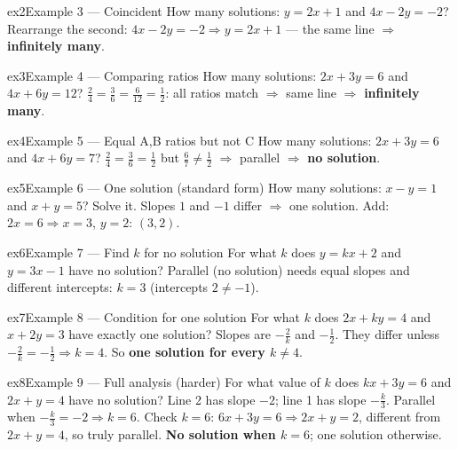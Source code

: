 \documentclass[11pt]{article}
\begin{document}
\begin{example}{ex2}{Example 3 --- Coincident}
How many solutions: $y=2x+1$ and $4x-2y=-2$?
\soln Rearrange the second: $4x-2y=-2\Rightarrow y=2x+1$ --- the same line $\Rightarrow$ \textbf{infinitely many}.
\end{example}

\begin{example}{ex3}{Example 4 --- Comparing ratios}
How many solutions: $2x+3y=6$ and $4x+6y=12$?
\soln $\tfrac{2}{4}=\tfrac{3}{6}=\tfrac{6}{12}=\tfrac12$: all ratios match $\Rightarrow$ same line $\Rightarrow$ \textbf{infinitely many}.
\end{example}

\begin{example}{ex4}{Example 5 --- Equal A,B ratios but not C}
How many solutions: $2x+3y=6$ and $4x+6y=7$?
\soln $\tfrac{2}{4}=\tfrac{3}{6}=\tfrac12$ but $\tfrac{6}{7}\neq\tfrac12$ $\Rightarrow$ parallel $\Rightarrow$ \textbf{no solution}.
\end{example}

\begin{example}{ex5}{Example 6 --- One solution (standard form)}
How many solutions: $x-y=1$ and $x+y=5$? Solve it.
\soln Slopes $1$ and $-1$ differ $\Rightarrow$ one solution. Add: $2x=6\Rightarrow x=3$, $y=2$: $(3,2)$.
\end{example}

\begin{example}{ex6}{Example 7 --- Find $k$ for no solution}
For what $k$ does $y=kx+2$ and $y=3x-1$ have no solution?
\soln Parallel (no solution) needs equal slopes and different intercepts: $k=3$ (intercepts $2\neq-1$).
\end{example}

\begin{example}{ex7}{Example 8 --- Condition for one solution}
For what $k$ does $2x+ky=4$ and $x+2y=3$ have exactly one solution?
\soln Slopes are $-\tfrac{2}{k}$ and $-\tfrac12$. They differ unless $-\tfrac{2}{k}=-\tfrac12\Rightarrow k=4$. So \textbf{one solution for every $k\neq4$}.
\end{example}

\begin{example}{ex8}{Example 9 --- Full analysis (harder)}
For what value of $k$ does $kx+3y=6$ and $2x+y=4$ have no solution?
\soln Line 2 has slope $-2$; line 1 has slope $-\tfrac{k}{3}$. Parallel when $-\tfrac{k}{3}=-2\Rightarrow k=6$. Check $k=6$: $6x+3y=6\Rightarrow 2x+y=2$, different from $2x+y=4$, so truly parallel. \textbf{No solution when $k=6$}; one solution otherwise.
\end{example}
\end{document}
